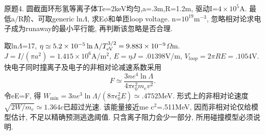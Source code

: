 \begin{exercise}\label{ex:03-4-4}
原题4. 圆截面环形氢等离子体Te=2keV均匀,a=.3m,R=1.2m, 驱动I=$4\times10^5$A. 最低a/R阶、可取generic ln\ensuremath{\Lambda}, 求E\ensuremath{\phi}和单匝loop voltage. n=$10^{19}$m$^{-3}$, 忽略相对论求电子成为runaway的最小平行能, 再判断该忽略是否合理.
\end{exercise}
\begin{solution}
取ln\ensuremath{\Lambda}=17, $\eta\simeq5.2\times10^{-5}\ln\Lambda/T_{\rm eV}^{3/2}=9.883\times10^{-9}$\ensuremath{\Omega}m. $J=I/(\pi a^2)=1.415\times10^6$A/m\ensuremath{{}^{2}}, $E=\eta J=.01398$V/m, $V_{loop}=2\pi RE=.1054$V. 快电子同时撞离子及电子的非相对论减速系数采用 \begin{equation}F\simeq\frac{3ne^4\ln\Lambda}{4\pi\epsilon_0^2m_ev^2}.\end{equation} 令eE=F, 得 $W_{\min}=3ne^3\ln\Lambda/(8\pi\epsilon_0^2E)\simeq.4752$MeV. 形式上的非相对论速度$\sqrt{2W/m_e}\simeq1.364c$已超过光速. 该能量接近me c\ensuremath{{}^{2}}=.511MeV, 因而非相对论仅给模型估计, 不足以精确预测逃逸阈值. 只含离子阻力会少一部分, 所用碰撞模型必须说明.
\end{solution}
